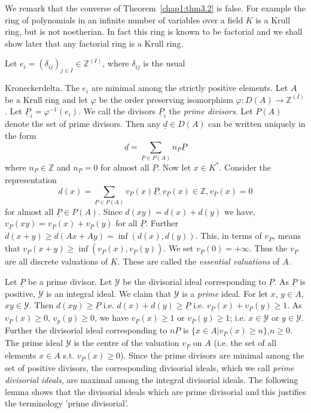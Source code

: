 \noindent 
  We remark that the converse of Theorem~\ref{chap1:thm3.2} is
  false. For example 
  the ring of polynomials in an infinite number of variables over a
  field $K$ is a Krull ring, but is not noetherian. In fact this ring
  is known to be factorial and we shall show later that any factorial
  ring is a Krull ring.  

  Let $e_i = ( \delta_{ij}) _{j \in I} \in \mathbb{Z}^{(I)}$, where
  $\delta_{ij}$ is the usual  
  
  \noindent
  Kronecker\pageoriginale delta. The $e_i$ are minimal among the
  strictly positive 
  elements. Let $A$ be a Krull ring and let $\varphi$ be the order
  preserving isomorphism $\varphi : D(A) \to \mathbb{Z}^{(I)}$. Let
  $\underline{P}_i = \varphi^{-1} (e_i)$. We call the divisors
  $\underline{P}_i$ the \textit{prime divisors}. Let $P(A)$ denote the
  set of prime divisors. Then any $\underline{d} \in D(A)$ can be
  written uniquely in the form 
  $$
  \underline{d} = \sum\limits_{\underline{P} \in P(A)}
  n_{\underline{P}} \underline{P} 
  $$
  where $n_{\underline{P}} \in \mathbb{Z}$ and $n_{\underline{P}} = 0$
  for almost all $\underline{P}$. Now let $x \in K^*$. Consider the
  representation 
  $$
  d(x) = \sum_{\underline{P} \in P(A)} v_{\underline{P}} (x)
  \underline{P}, v_{\underline{P}} (x) \in \mathbb{Z},
  v_{\underline{P}} (x) = 0 
  $$
  for almost  all $\underline{P} \in P(A)$. Since $d(xy)=d(x)+d(y)$ we
  have, $v_{\underline{P}}(xy) = v_{\underline{P}}(x) +
  v_{\underline{P}}(y)$ for all $\underline{P}$. Further $d(x+y) \ge
  d(Ax+Ay) = \inf (d(x), d(y))$. This, in terms of
  $v_{\underline{P}}$, means that $v_{\underline{P}} (x+y) \ge \inf
  (v_{\underline{P}}(x), v_{\underline{P}}(y))$. We set
  $v_{\underline{P}}(0) = + \infty$. Thus the $v_{\underline{P}}$ are
  all discrete valuations of $K$. These are called the
  \textit{essential valuations} of $A$.  
  
  Let $\underline{P}$ be a prime divisor. Let $\mathscr{Y}$ be the
  divisorial ideal corresponding to $\underline{P}$. As
  $\underline{P}$ is positive, $\mathscr{Y}$ is an integral ideal. We
  claim that $\mathscr{Y}$ is a \textit{prime} ideal. For let $x$, $y
  \in A$, $xy \in \mathscr{Y}$. Then $d(xy) \ge \underline{P}$ i.e. $d(x)
   + d(y) \ge \underline{P}$ i.e. $v_{\underline{P}} (x) +
  v_{\underline{P}}(y) \ge 1$. As $v_{\underline{P}} (x) \ge 0$, $v_p(y)
 \geq 0$, we have $v_{\underline{P}}(x) \ge 1$  or $v_{\underline{P}} (y) \ge 1$;
  i.e. $x \in \mathscr{Y}$ or $y \in \mathscr{Y}$. Further the
  divisorial ideal corresponding to $n \underline{P} $ is $\big\{ x
  \in A \big| v_{\underline{P}} (x) \ge n \big\}$,\pageoriginale $n
  \ge 0$. The 
  prime ideal $\mathscr{Y}$ is the centre of the valuation
  $v_{\underline{P}}$ on $A$ (i.e. the set of all elements $x \in A$
  s.t. $v_{\underline{P}} (x) \ge 0$). Since the prime divisors are
  minimal among the set of positive divisors, the corresponding
  divisorial ideals, which we call \textit{prime divisorial ideals},
  are maximal among the integral divisorial ideals. The following
  lemma shows that the divisorial ideals which are prime
  divisorial and this justifies the terminology 'prime divisorial'. 
  
